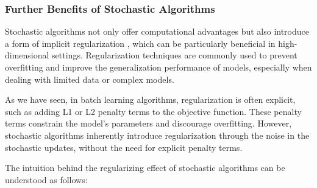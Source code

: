 \subsubsection{Further Benefits of Stochastic Algorithms}
Stochastic algorithms not only offer computational advantages but also introduce a form of implicit regularization \citep{smith2021origin}, which can be particularly beneficial in high-dimensional settings. Regularization techniques are commonly used to prevent overfitting and improve the generalization performance of models, especially when dealing with limited data or complex models.

As we have seen, in batch learning algorithms, regularization is often explicit, such as adding L1 or L2 penalty terms to the objective function. These penalty terms constrain the model's parameters and discourage overfitting. However, stochastic algorithms inherently introduce regularization through the noise in the stochastic updates, without the need for explicit penalty terms.

The intuition behind the regularizing effect of stochastic algorithms can be understood as follows:

